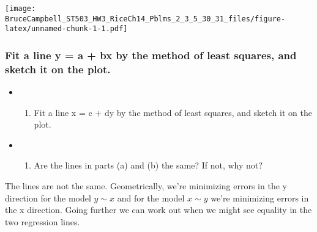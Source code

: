 \documentclass[12pt,]{article}
\newenvironment{Shaded}{\begin{snugshade}}{\end{snugshade}}
\newcommand{\KeywordTok}[1]{\textcolor[rgb]{0.13,0.29,0.53}{\textbf{#1}}}
\newcommand{\DataTypeTok}[1]{\textcolor[rgb]{0.13,0.29,0.53}{#1}}
\newcommand{\DecValTok}[1]{\textcolor[rgb]{0.00,0.00,0.81}{#1}}
\newcommand{\StringTok}[1]{\textcolor[rgb]{0.31,0.60,0.02}{#1}}
\newcommand{\OtherTok}[1]{\textcolor[rgb]{0.56,0.35,0.01}{#1}}
\newcommand{\OperatorTok}[1]{\textcolor[rgb]{0.81,0.36,0.00}{\textbf{#1}}}
\newcommand{\NormalTok}[1]{#1}
\providecommand{\tightlist}{%
  \setlength{\itemsep}{0pt}\setlength{\parskip}{0pt}}
\begin{document}
\begin{Shaded}
\end{Shaded}

\texttt{[image: BruceCampbell\_ST503\_HW3\_RiceCh14\_Pblms\_2\_3\_5\_30\_31\_files/figure-latex/unnamed-chunk-1-1.pdf]}

\subsubsection{Fit a line y = a + bx by the method of least squares, and
sketch it on the
plot.}\label{fit-a-line-y-a-bx-by-the-method-of-least-squares-and-sketch-it-on-the-plot.}

\begin{itemize}
\item
  \begin{enumerate}
  \def\labelenumi{\alph{enumi}.}
  \setcounter{enumi}{1}
  \tightlist
  \item
    Fit a line x = c + dy by the method of least squares, and sketch it
    on the plot.
  \end{enumerate}
\item
  \begin{enumerate}
  \def\labelenumi{\alph{enumi}.}
  \setcounter{enumi}{2}
  \tightlist
  \item
    Are the lines in parts (a) and (b) the same? If not, why not?
  \end{enumerate}
\end{itemize}

The lines are not the same. Geometrically, we're minimizing errors in
the y direction for the model \(y \sim x\) and for the model
\(x \sim y\) we're minimizing errors in the x direction. Going further
we can work out when we might see equality in the two regression lines.
\end{document}
